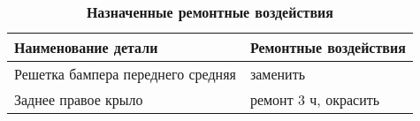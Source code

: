 %		
%		
%


{\small \begin{table}
	\begin{longtable}{@{}ll@{}}
	\caption[]{\footnotesize {\textbf{Назначенные ремонтные воздействия}}} \label{tab:2}\\ 
	\toprule
\textbf{Наименование детали}                      & \textbf{Ремонтные воздействия}\\ \midrule
Решетка бампера переднего средняя        & заменить             \\
Заднее правое крыло                      & ремонт 3 ч, окрасить \\ \bottomrule
\end{longtable}

\end{table}}


